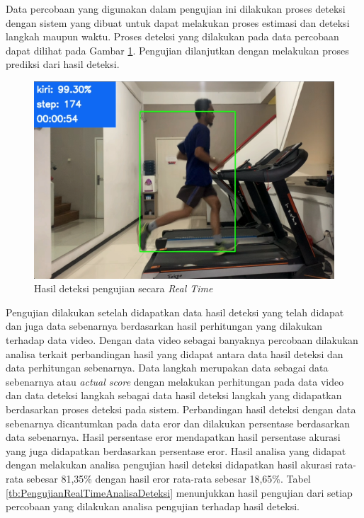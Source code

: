 Data percobaan yang digunakan dalam pengujian ini dilakukan proses deteksi dengan sistem yang dibuat untuk dapat melakukan proses estimasi dan deteksi langkah maupun waktu. Proses deteksi yang dilakukan pada data percobaan dapat dilihat pada Gambar \ref{fig:PengujianRealTime2}. Pengujian dilanjutkan dengan melakukan proses prediksi dari hasil deteksi.

\begin{figure}[H]
  \centering
  \includegraphics[scale=0.5]{gambar/realtimedeteksi.png}
  \caption{Hasil deteksi pengujian secara \emph{Real Time}}
  \label{fig:PengujianRealTime2}
\end{figure}

Pengujian dilakukan setelah didapatkan data hasil deteksi yang telah didapat dan juga data sebenarnya berdasarkan hasil perhitungan yang dilakukan terhadap data video. Dengan data video sebagai banyaknya percobaan dilakukan analisa terkait perbandingan hasil yang didapat antara data hasil deteksi dan data perhitungan sebenarnya. Data langkah merupakan data sebagai data sebenarnya atau \emph{actual score} dengan melakukan perhitungan pada data video dan data deteksi langkah sebagai data hasil deteksi langkah yang didapatkan berdasarkan proses deteksi pada sistem. Perbandingan hasil deteksi dengan data sebenarnya dicantumkan pada data eror dan dilakukan persentase berdasarkan data sebenarnya. Hasil persentase eror mendapatkan hasil persentase akurasi yang juga didapatkan berdasarkan persentase eror. Hasil analisa yang didapat dengan melakukan analisa pengujian hasil deteksi didapatkan hasil akurasi rata-rata sebesar 81,35\% dengan hasil eror rata-rata sebesar 18,65\%. Tabel \ref{tb:PengujianRealTimeAnalisaDeteksi} menunjukkan hasil pengujian dari setiap percobaan yang dilakukan analisa pengujian terhadap hasil deteksi.

